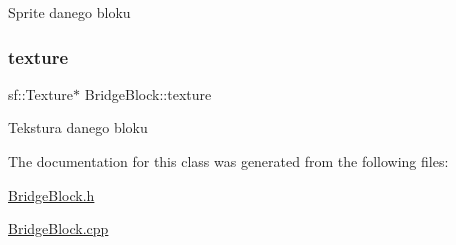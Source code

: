 Sprite danego bloku \mbox{\label{class_bridge_block_aeab425af654b8ae2edc7ba29421fe5b0}} 
\subsubsection{\texorpdfstring{texture}{texture}}
{\footnotesize\ttfamily sf\+::\+Texture$\ast$ Bridge\+Block\+::texture\hspace{0.3cm}{\ttfamily [protected]}}

Tekstura danego bloku 

The documentation for this class was generated from the following files\+:\begin{DoxyCompactItemize}
\item 
\hyperlink{_bridge_block_8h}{Bridge\+Block.\+h}\item 
\hyperlink{_bridge_block_8cpp}{Bridge\+Block.\+cpp}\end{DoxyCompactItemize}
